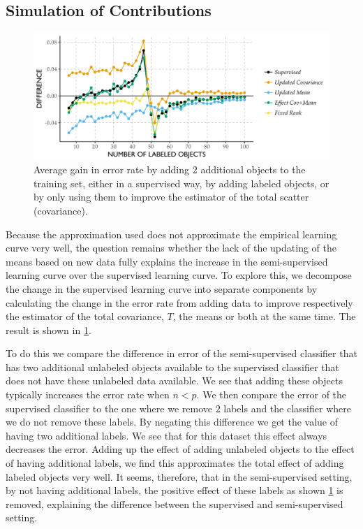 \documentclass[twoside]{memoir}\usepackage[]{graphicx}\usepackage{xcolor}
\makeatletter
\def\maxwidth{ %
  \ifdim\Gin@nat@width>\linewidth
    \linewidth
  \else
    \Gin@nat@width
  \fi
}
\newenvironment{knitrout}{}{} %
\makeatother
\begin{document}
\subsection{Simulation of Contributions}
\begin{knitrout}
\color{fgcolor}\begin{figure}
\includegraphics[width=\maxwidth]{figure/contributions-1} \caption[Average gain in error rate by adding $2$ additional objects to the training set, either in a supervised way, by adding labeled objects, or by only using them to improve the estimator of the total scatter (covariance)]{Average gain in error rate by adding $2$ additional objects to the training set, either in a supervised way, by adding labeled objects, or by only using them to improve the estimator of the total scatter (covariance).}\label{fig:contributions}
\end{figure}


\end{knitrout}
Because the approximation used does not approximate the empirical learning curve very well, the question remains whether the lack of the updating of the means based on new data fully explains the increase in the semi-supervised learning curve over the supervised learning curve. To explore this, we decompose the change in the supervised learning curve into separate components by calculating the change in the error rate from adding data to improve respectively the estimator of the total covariance, $T$, the means or both at the same time. The result is shown in \cref{fig:contributions}.

To do this we compare the difference in error of the semi-supervised classifier that has two additional unlabeled objects available to the supervised classifier that does not have these unlabeled data available. We see that adding these objects typically increases the error rate when $n<p$.  We then compare the error of the supervised classifier to the one where we remove $2$ labels and the classifier where we do not remove these labels. By negating this difference we get the value of having two additional labels. We see that for this dataset this effect always decreases the error.  Adding up the effect of adding unlabeled objects to the effect of having additional labels, we find this approximates the total effect of adding labeled objects very well. It seems, therefore, that in the semi-supervised setting, by not having additional labels, the positive effect of these labels as shown \cref{fig:contributions} is removed, explaining the difference between the supervised and semi-supervised setting.
\end{document}
